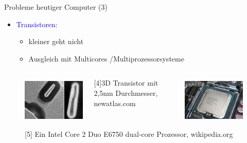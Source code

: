 \documentclass{beamer}
\begin{document}
\begin{frame}{Probleme heutiger Computer (3)}
		\begin{itemize}
			\item \textcolor{blue}{Transistoren:}
			\begin{itemize}
				\item kleiner geht nicht
			    \item Ausgleich mit Multicores /Multiprozessorsysteme
			\end{itemize}
		\end{itemize}
	
\begin{figure}	
	\begin{columns}
		\centering
		\includegraphics[height=3cm, width=3cm]{./5.jpg}\caption{[4]3D Transistor mit 2,5nm Durchmesser, newatlas.com}
		
		\centering
		\includegraphics[height=3cm, width=3cm]{./5.2.jpg}\caption{[5] Ein Intel Core 2 Duo E6750 dual-core Prozessor, wikipedia.org}
	\end{columns} 
\end{figure}
\end{frame}
\end{document}
